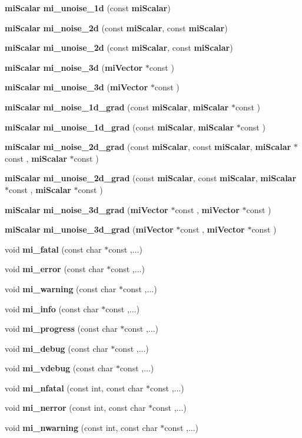 \begin{CompactItemize}
{\bf mi\-Scalar} {\bf mi\_\-unoise\_\-1d} (const {\bf mi\-Scalar})
\item 
{\bf mi\-Scalar} {\bf mi\_\-noise\_\-2d} (const {\bf mi\-Scalar}, const {\bf mi\-Scalar})
\item 
{\bf mi\-Scalar} {\bf mi\_\-unoise\_\-2d} (const {\bf mi\-Scalar}, const {\bf mi\-Scalar})
\item 
{\bf mi\-Scalar} {\bf mi\_\-noise\_\-3d} ({\bf mi\-Vector} $\ast$const )
\item 
{\bf mi\-Scalar} {\bf mi\_\-unoise\_\-3d} ({\bf mi\-Vector} $\ast$const )
\item 
{\bf mi\-Scalar} {\bf mi\_\-noise\_\-1d\_\-grad} (const {\bf mi\-Scalar}, {\bf mi\-Scalar} $\ast$const )
\item 
{\bf mi\-Scalar} {\bf mi\_\-unoise\_\-1d\_\-grad} (const {\bf mi\-Scalar}, {\bf mi\-Scalar} $\ast$const )
\item 
{\bf mi\-Scalar} {\bf mi\_\-noise\_\-2d\_\-grad} (const {\bf mi\-Scalar}, const {\bf mi\-Scalar}, {\bf mi\-Scalar} $\ast$const , {\bf mi\-Scalar} $\ast$const )
\item 
{\bf mi\-Scalar} {\bf mi\_\-unoise\_\-2d\_\-grad} (const {\bf mi\-Scalar}, const {\bf mi\-Scalar}, {\bf mi\-Scalar} $\ast$const , {\bf mi\-Scalar} $\ast$const )
\item 
{\bf mi\-Scalar} {\bf mi\_\-noise\_\-3d\_\-grad} ({\bf mi\-Vector} $\ast$const , {\bf mi\-Vector} $\ast$const )
\item 
{\bf mi\-Scalar} {\bf mi\_\-unoise\_\-3d\_\-grad} ({\bf mi\-Vector} $\ast$const , {\bf mi\-Vector} $\ast$const )
\item 
void {\bf mi\_\-fatal} (const char $\ast$const ,...)
\item 
void {\bf mi\_\-error} (const char $\ast$const ,...)
\item 
void {\bf mi\_\-warning} (const char $\ast$const ,...)
\item 
void {\bf mi\_\-info} (const char $\ast$const ,...)
\item 
void {\bf mi\_\-progress} (const char $\ast$const ,...)
\item 
void {\bf mi\_\-debug} (const char $\ast$const ,...)
\item 
void {\bf mi\_\-vdebug} (const char $\ast$const ,...)
\item 
void {\bf mi\_\-nfatal} (const int, const char $\ast$const ,...)
\item 
void {\bf mi\_\-nerror} (const int, const char $\ast$const ,...)
\item 
void {\bf mi\_\-nwarning} (const int, const char $\ast$const ,...)

\end{CompactItemize}
